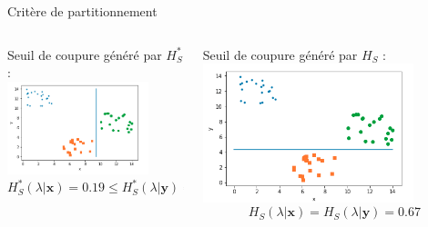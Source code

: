 \documentclass[usenames,dvipsnames]{beamer}
\begin{document}
\begin{frame}{Critère de partitionnement}
    \begin{columns}
        \begin{column}{0.5\textwidth}
            \centering
            Seuil de coupure généré par $H^*_S$ : \\
            \includegraphics[width=0.8\textwidth]{threshold_rsdm.png}
            $$H^*_S(\lambda | \mathbf{x}) =  0.19 \leq H^*_S(\lambda | \mathbf{y}) =  0.53$$
        \end{column}
        \begin{column}{0.5\textwidth}
            \centering
            Seuil de coupure généré par $H_S$ :
	    \includegraphics[width=0.8\textwidth]{threshold_sdm.png}
            $$H_S(\lambda | \mathbf{x}) = H_S(\lambda | \mathbf{y}) =  0.67$$
        \end{column}
    \end{columns}
\end{frame}
\end{document}
